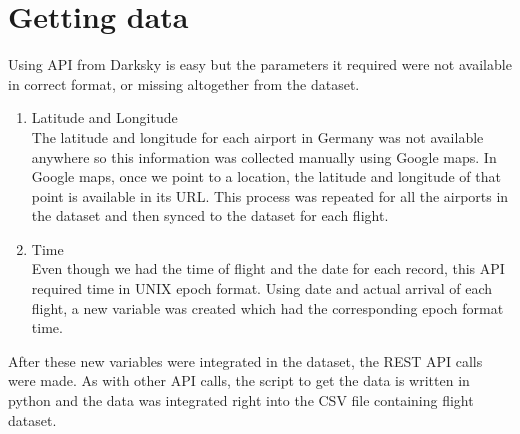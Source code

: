 \section{Getting data}
Using API from Darksky is easy but the parameters it required were not available in correct format, or missing altogether from the dataset. 
\begin{enumerate}
    \item Latitude and Longitude
    \\ The latitude and longitude for each airport in Germany was not available anywhere so this information was collected manually using Google maps. In Google maps, once we point to a location, the latitude and longitude of that point is available in its URL. This process was repeated for all the airports in the dataset and then synced to the dataset for each flight.
    \item Time
    \\Even though we had the time of flight and the date for each record, this API required time in UNIX epoch format. Using date and actual arrival of each flight, a new variable was created which had the corresponding epoch format time.
\end{enumerate}

After these new variables were integrated in the dataset, the REST API calls were made. As with other API calls, the script to get the data is written in python and the data was integrated right into the CSV file containing flight dataset. 


